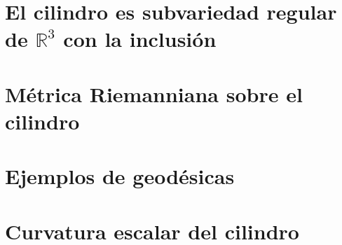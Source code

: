 \documentclass[twoside, 11pt]{article}
\theoremstyle{definition}
\newcommand{\R}{\mathbb{R}}
\begin{document}
\section{El cilindro es subvariedad regular de $\R^3$ con la inclusión}



\section{Métrica Riemanniana sobre el cilindro}




\section{Ejemplos de geodésicas}




\section{Curvatura escalar del cilindro}
\end{document}
